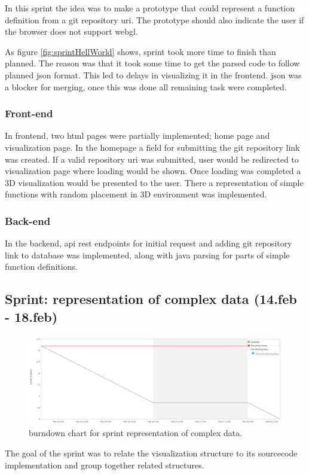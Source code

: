 In this sprint the idea was to make a prototype that could represent a function definition from a \gls{git} repository \gls{uri}. The prototype should also indicate the user if the browser does not support \gls{webgl}.

As figure \ref{fig:sprintHellWorld} shows, sprint took more time to finish than planned. The reason was that it took some time to get the parsed code to follow planned \gls{json} format. This led to delays in visualizing it in the \gls{frontend}. \Gls{json} was a blocker for merging, once this was done all remaining task were completed.

\subsubsection{Front-end}
In \gls{frontend}, two \gls{html} pages were partially implemented; home page and visualization page.
In the homepage a field for submitting the \gls{git} repository link was created. If a valid repository \gls{uri} was submitted, user would be redirected to visualization page where loading would be shown. Once loading was completed a 3D visualization would be presented to the user.
There a representation of simple functions with random placement in 3D environment was implemented.

\subsubsection{Back-end}
In the \gls{backend}, \gls{api} \gls{rest} endpoints for initial request and adding \gls{git} repository link to database was implemented, along with java parsing for parts of simple function definitions. 

\subsection{Sprint: representation of complex data (14.feb - 18.feb)}
\begin{figure}[H] 
    \includegraphics[width=\textwidth]{inc/images/sprints/sprintRepresentComplexData140219-180219.png}
    \caption{\Gls{burndown} chart for \gls{sprint} representation of complex data.}
    \label{fig:sprintRepresentationOfComplexData}
\end{figure}
The goal of the \gls{sprint} was to relate the visualization structure to its \gls{sourcecode} implementation and group together related structures.

